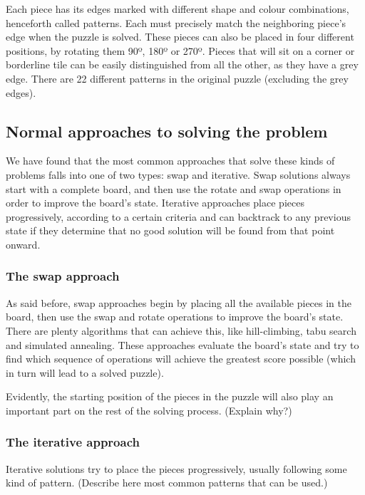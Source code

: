 \documentclass{llncs}
\begin{document}
Each piece has its edges marked with different shape and colour combinations, henceforth called patterns. Each must precisely match the neighboring piece's edge when the puzzle is solved. These pieces can also be placed in four different positions, by rotating them 90º, 180º or 270º. Pieces that will sit on a corner or borderline tile can be easily distinguished from all the other, as they have a grey edge. There are 22 different patterns in the original puzzle (excluding the grey edges).

\subsection{Normal approaches to solving the problem}\label{sec:normal_approaches}

We have found that the most common approaches that solve these kinds of problems falls into one of two types: swap and iterative. Swap solutions always start with a complete board, and then use the rotate and swap operations in order to improve the board's state. Iterative approaches place pieces progressively, according to a certain criteria and can backtrack to any previous state if they determine that no good solution will be found from that point onward.

\subsubsection{The swap approach}\label{sec:swap_approach}

As said before, swap approaches begin by placing all the available pieces in the board, then use the swap and rotate operations to improve the board's state. There are plenty algorithms that can achieve this, like hill-climbing, tabu search and simulated annealing. These approaches evaluate the board's state and try to find which sequence of operations will achieve the greatest score possible (which in turn will lead to a solved puzzle).

Evidently, the starting position of the pieces in the puzzle will also play an important part on the rest of the solving process. (Explain why?)

\subsubsection{The iterative approach}\label{sec:iterative_approach}

Iterative solutions try to place the pieces progressively, usually following some kind of pattern.
(Describe here most common patterns that can be used.)
\end{document}
